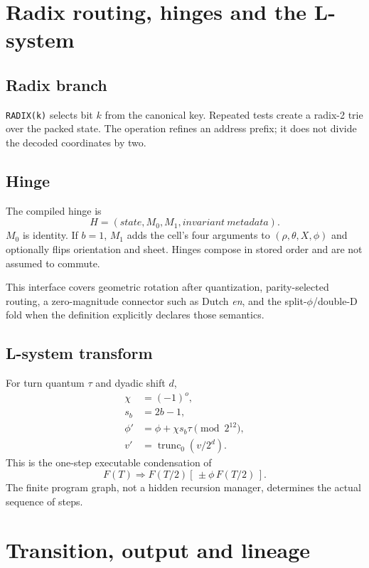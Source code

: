 \documentclass[11pt,a4paper]{article}
\newcommand{\code}[1]{\texttt{#1}}
\begin{document}
\section{Radix routing, hinges and the L-system}

\subsection{Radix branch}
\code{RADIX(k)} selects bit $k$ from the canonical key. Repeated tests create a radix-2 trie over the packed state. The operation refines an address prefix; it does not divide the decoded coordinates by two.

\subsection{Hinge}
The compiled hinge is
\begin{equation}
H=(state,M_0,M_1,invariant\ metadata).
\end{equation}
$M_0$ is identity. If $b=1$, $M_1$ adds the cell's four arguments to $(\rho,\theta,X,\phi)$ and optionally flips orientation and sheet. Hinges compose in stored order and are not assumed to commute.

This interface covers geometric rotation after quantization, parity-selected routing, a zero-magnitude connector such as Dutch \emph{en}, and the split-$\phi$/double-D fold when the definition explicitly declares those semantics.

\subsection{L-system transform}
For turn quantum $\tau$ and dyadic shift $d$,
\begin{align}
\chi&=(-1)^o,\\
s_b&=2b-1,\\
\phi'&=\phi+\chi s_b\tau\pmod{2^{12}},\\
v'&=\operatorname{trunc}_0(v/2^d).
\end{align}
This is the one-step executable condensation of
\begin{equation}
F(T)\Rightarrow F(T/2)[\,\pm\phi\,F(T/2)\,].
\end{equation}
The finite program graph, not a hidden recursion manager, determines the actual sequence of steps.

\section{Transition, output and lineage}
\end{document}
